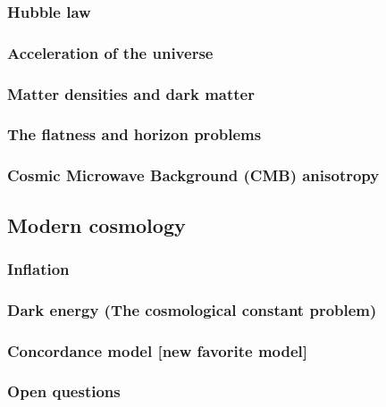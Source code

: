 \documentclass{article}
\theoremstyle{definition}
\begin{document}
\subsubsection{Hubble law}
\subsubsection{Acceleration of the universe}
\subsubsection{Matter densities and dark matter}
\subsubsection{The flatness and horizon problems}
\subsubsection{Cosmic Microwave Background (CMB) anisotropy}
\subsection{Modern cosmology}
\subsubsection{Inflation}
\subsubsection{Dark energy (The cosmological constant problem)}
\subsubsection{Concordance model [new favorite model]}
\subsubsection{Open questions}

\newpage
 
\end{document}
